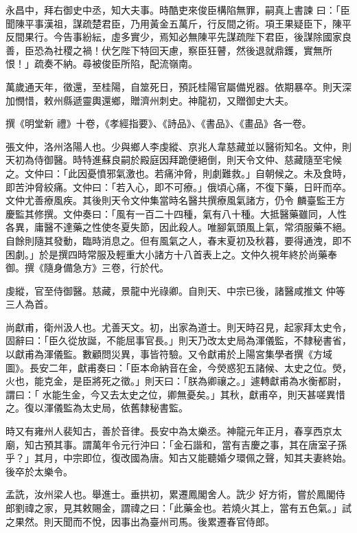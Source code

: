 \begin{pinyinscope}
 永昌中，拜右御史中丞，知大夫事。時酷吏來俊臣構陷無罪，嗣真上書諫
 曰：「臣聞陳平事漢祖，謀疏楚君臣，乃用黃金五萬斤，行反間之術。項王果疑臣下，陳平反間果行。今告事紛紜，虛多實少，焉知必無陳平先謀疏陛下君臣，後謀除國家良善，臣恐為社稷之禍！伏乞陛下特回天慮，察臣狂瞽，然後退就鼎鑊，實無所恨！」疏奏不納。尋被俊臣所陷，配流嶺南。



 萬歲通天年，徵還，至桂陽，自筮死日，預託桂陽官屬備兇器。依期暴卒。則天深加憫惜，敕州縣遞靈輿還鄉，贈濟州刺史。神龍初，又贈御史大夫。



 撰《明堂新
 禮》十卷，《孝經指要》、《詩品》、《書品》、《畫品》各一卷。



 張文仲，洛州洛陽人也。少與鄉人李虔縱、京兆人韋慈藏並以醫術知名。文仲，則天初為侍御醫。時特進蘇良嗣於殿庭因拜跪便絕倒，則天令文仲、慈藏隨至宅候之。文仲曰：「此因憂憤邪氣激也。若痛沖脅，則劇難救。」自朝候之。未及食時，即苦沖脅絞痛。文仲曰：「若入心，即不可療。」俄頃心痛，不復下藥，日旰而卒。文仲尤善療風疾。其後則天令文仲集當時名醫共撰療風氣諸方，仍令
 麟臺監王方慶監其修撰。文仲奏曰：「風有一百二十四種，氣有八十種。大抵醫藥雖同，人性各異，庸醫不達藥之性使冬夏失節，因此殺人。唯腳氣頭風上氣，常須服藥不絕。自餘則隨其發動，臨時消息之。但有風氣之人，春末夏初及秋暮，要得通洩，即不困劇。」於是撰四時常服及輕重大小諸方十八首表上之。文仲久視年終於尚藥奉御。撰《隨身備急方》三卷，行於代。



 虔縱，官至侍御醫。慈藏，景龍中光祿卿。自則天、中宗已後，諸醫咸推文
 仲等三人為首。



 尚獻甫，衛州汲人也。尤善天文。初，出家為道士。則天時召見，起家拜太史令，固辭曰：「臣久從放誕，不能屈事官長。」則天乃改太史局為渾儀監，不隸秘書省，以獻甫為渾儀監。數顧問災異，事皆符驗。又令獻甫於上陽宮集學者撰《方域圖》。長安二年，獻甫奏曰：「臣本命納音在金，今熒惑犯五諸候、太史之位。熒，火也，能克金，是臣將死之徵。」則天曰：「朕為卿禳之。」遽轉獻甫為水衡都尉，謂曰：「
 水能生金，今又去太史之位，卿無憂矣。」其秋，獻甫卒，則天甚嗟異惜之。復以渾儀監為太史局，依舊隸秘書監。



 時又有雍州人裴知古，善於音律。長安中為太樂丞。神龍元年正月，春享西京太廟，知古預其事。謂萬年令元行沖曰：「金石諧和，當有吉慶之事，其在唐室子孫乎？」其月，中宗即位，復改國為唐。知古又能聽婚夕環佩之聲，知其夫妻終始。後卒於太樂令。



 孟詵，汝州梁人也。舉進士。垂拱初，累遷鳳閣舍人。詵少
 好方術，嘗於鳳閣侍郎劉禕之家，見其敕賜金，謂禕之曰：「此藥金也。若燒火其上，當有五色氣。」試之果然。則天聞而不悅，因事出為臺州司馬。後累遷春官侍郎。




\end{pinyinscope}
